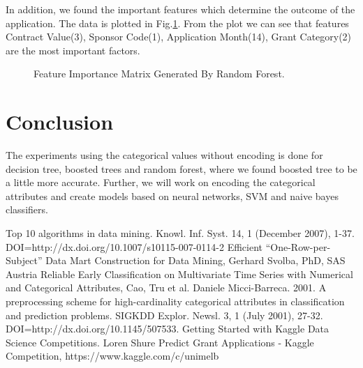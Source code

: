\documentclass{article} %
\begin{document}
In addition, we found the important features which determine the outcome of the application. The data is plotted in Fig.\ref{fig:FIM}. From the plot we can see that features Contract Value(3), Sponsor Code(1), Application Month(14), Grant Category(2) are the most important factors.

\begin{figure}[h]
	\begin{center}
	\end{center}
	\caption{Feature Importance Matrix Generated By Random Forest.}
	\label{fig:FIM}
\end{figure}


\section{Conclusion}
The experiments using the categorical values without encoding is done for decision tree, boosted trees and random forest, where we found boosted tree to be a little more accurate. Further, we will work on encoding the categorical attributes and create models based on neural networks, SVM and naive bayes classifiers.

\begin{thebibliography}{10} %
	 Top 10 algorithms in data mining. Knowl. Inf. Syst. 14, 1 (December 2007), 1-37. DOI=http://dx.doi.org/10.1007/s10115-007-0114-2
	 Efficient “One-Row-per-Subject” Data Mart Construction for Data Mining, Gerhard Svolba, PhD, SAS Austria
	 Reliable Early Classification on Multivariate Time Series with Numerical and Categorical Attributes, Cao, Tru et al.
	Daniele Micci-Barreca. 2001. A preprocessing scheme for high-cardinality categorical attributes in classification and prediction problems. SIGKDD Explor. Newsl. 3, 1 (July 2001), 27-32. DOI=http://dx.doi.org/10.1145/507533.
	 Getting Started with Kaggle Data Science Competitions. Loren Shure
	 Predict Grant Applications - Kaggle Competition, https://www.kaggle.com/c/unimelb 
\end{thebibliography}
\end{document}
